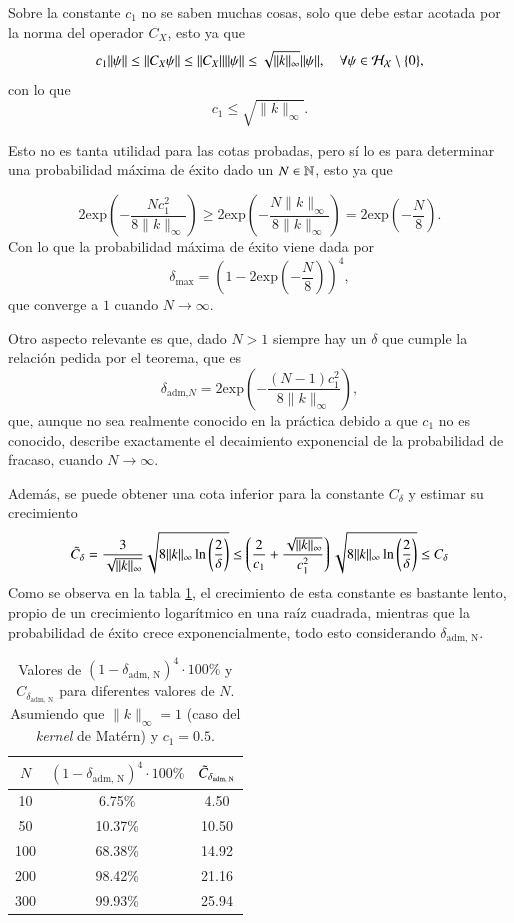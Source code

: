 \begin{obs}
    Sobre la constante $c_1$ no se saben muchas cosas, solo que debe estar acotada por la norma del operador $C_X$, esto ya que
    \[
    c_1 \| \psi \| \leq \| C_X \psi \| \leq \| C_X\| \| \psi \| \leq \sqrt{\| k \|_\infty} \| \psi \|, \quad \forall \psi \in \mathcal{H}_{\mathcal{X}} \setminus \{ 0 \},
    \]
    con lo que
    \[
    c_1 \leq \sqrt{\| k \|_\infty}.
    \]

    Esto no es tanta utilidad para las cotas probadas, pero sí lo es para determinar una probabilidad máxima de éxito dado un $N \in \mathbb{N}$, esto ya que

    \[
    2\text{exp} \left ( - \frac{N c_1^2}{8 \| k \|_\infty} \right ) \geq 2\text{exp} \left ( - \frac{N \| k \|_\infty}{8 \| k \|_\infty} \right ) = 2\text{exp} \left ( - \frac{N}{8} \right ).
    \]
    Con lo que la probabilidad máxima de éxito viene dada por
    \[
    \delta_{\text{max}} = \left ( 1-2\text{exp} \left ( - \frac{N}{8} \right ) \right )^4,
    \]
    que converge a $1$ cuando $N \to \infty$.

    Otro aspecto relevante es que, dado $N > 1$ siempre hay un $\delta$ que cumple la relación pedida por el teorema, que es
    \[
    \delta_{\text{adm,} N} = 2\text{exp} \left ( - \frac{(N-1) c_1^2}{8 \| k \|_\infty} \right ),
    \]
    que, aunque no sea realmente conocido en la práctica debido a que $c_1$ no es conocido, describe exactamente el decaimiento exponencial de la probabilidad de fracaso, cuando $N \to \infty$.

    Además, se puede obtener una cota inferior para la constante $C_\delta$ y estimar su crecimiento
    \[
     \Tilde{C}_\delta = \frac{3}{\sqrt{\| k \|_{\infty}}}\sqrt{8 \| k \|_\infty \ln \left ( \frac{2}{\delta}\right ) } \leq \left ( \frac{2}{c_1} + \frac{\sqrt{\| k \|_{\infty}}}{c_1^2}
  \right )\sqrt{8 \| k \|_\infty \ln \left ( \frac{2}{\delta}\right ) } \leq C_\delta 
    \]
    Como se observa en la tabla \ref{tab:ctes_cota_kEDMD}, el crecimiento de esta constante es bastante lento, propio de un crecimiento logarítmico en una raíz cuadrada, mientras que la probabilidad de éxito crece exponencialmente, todo esto considerando $\delta_{\text{adm, N}}$.
    \begin{table}[h!]
\centering
\begin{tabular}{|c|c|c|}
\hline
$N$ & $(1-\delta_{\text{adm, N}})^4 \cdot 100 \%$ & $\Tilde{C}_{\delta_{\text{adm, N}}}$ \\ \hline
10 & 6.75\% & 4.50 \\ \hline
50 & 10.37\% & 10.50 \\ \hline
100 & 68.38\% & 14.92 \\ \hline
200 & 98.42\% & 21.16 \\ \hline
300 & 99.93\% & 25.94 \\ \hline
\end{tabular}
\caption{Valores de $(1-\delta_{\text{adm, N}})^4 \cdot 100 \%$ y $C_{\delta_{\text{adm, N}}}$ para diferentes valores de $N$. Asumiendo que $\|k\|_\infty = 1$ (caso del \textit{kernel} de Matérn) y $c_1 = 0.5$.}
\label{tab:ctes_cota_kEDMD}
\end{table}
\end{obs}

